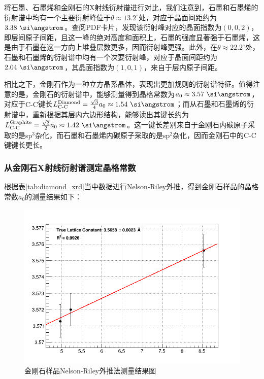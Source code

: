\documentclass{thuemp}
\begin{document}
将石墨、石墨烯和金刚石的X射线衍射谱进行对比，我们注意到，石墨和石墨烯的衍射谱中均有一个主要衍射峰位于$\theta \approx 13.2^\circ$处，对应于晶面间距约为$3.38~\text{\si\angstrom}$。查阅PDF卡片，发现该衍射峰对应的晶面指数为$(0,0,2)$，即层间原子间距，且这一峰的绝对高度和面积上，石墨的强度显著强于石墨烯，这是由于石墨在这一方向上堆叠层数更多，因而衍射峰更强。此外，在$\theta \approx 22.2^\circ$处，石墨和石墨烯的衍射谱中均有一个次要衍射峰，对应于晶面间距约为$2.04~\text{\si\angstrom}$，其晶面指数为$(1,0,1)$，来自于层内原子间距。

相比之下，金刚石作为一种立方晶系晶体，表现出更加规则的衍射谱特征。值得注意的是，金刚石的衍射谱中，能够测量得到晶格常数为$a_0 \approx 3.57~\text{\si\angstrom}$，对应于$\text{C-C}$键长$L_{\text{C-C}}^{\text{Diamond}} = \frac{\sqrt{3}}{4} a_0 \approx 1.54~\text{\si\angstrom}$；而从石墨和石墨烯的衍射谱中，重新根据其层内六边形结构，能够读出其键长约为$L_{\text{C-C}}^{\text{Graphite}} = \frac{\sqrt{3}}{2} a_0 \approx 1.42~\text{\si\angstrom}$。这一键长差别来自于金刚石内碳原子采取的是sp$^3$杂化，而石墨和石墨烯内碳原子采取的是sp$^2$杂化，因而金刚石中的$\text{C-C}$键键长更长。

\subsubsection{从金刚石X射线衍射谱测定晶格常数}

根据表\ref{tab:diamond_xrd}当中数据进行Nelson-Riley外推，得到金刚石样品的晶格常数$a_0$的测量结果如下：  

\begin{figure}[H]
    \centering
    \includegraphics[width=0.8\linewidth]{../Data/Fit_diamond_xrd.png}
    \caption{金刚石样品Nelson-Riley外推法测量结果图}
    \label{fig:diamond_xrd_extrapol}
\end{figure}
\end{document}

